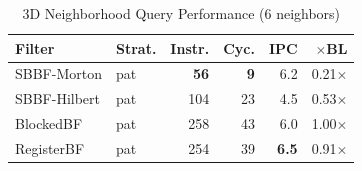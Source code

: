 
\begin{table}[htbp]
\centering
\caption{3D Neighborhood Query Performance (6 neighbors)}
\label{tab:neighbor-performance}
\begin{tabular}{@{}llrrrr@{}}
\toprule
Filter & Strat. & Instr. & Cyc. & IPC & $\times$BL \\
\midrule
SBBF-Morton & pat & \cellcolor{green!20}\textbf{56} & \cellcolor{green!20}\textbf{9} & 6.2 & 0.21$\times$ \\
SBBF-Hilbert & pat & 104 & 23 & 4.5 & 0.53$\times$ \\
BlockedBF & pat & 258 & 43 & 6.0 & 1.00$\times$ \\
RegisterBF & pat & 254 & 39 & \cellcolor{green!20}\textbf{6.5} & 0.91$\times$ \\
\bottomrule
\end{tabular}
\end{table}
